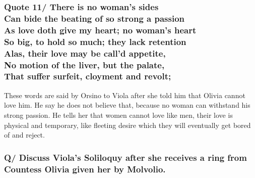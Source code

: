 \documentclass[12pt, a4paper]{article}
\begin{document}
\subsubsection*{Quote 11/
There is no woman's sides\\
Can bide the beating of so strong a passion\\
As love doth give my heart; no woman's heart\\
So big, to hold so much; they lack retention\\
Alas, their love may be call'd appetite,\\
No motion of the liver, but the palate,\\
That suffer surfeit, cloyment and revolt;
}

These words are said by Orsino to Viola after she told him that
Olivia cannot love him. He say he does not believe that, because 
no woman can withstand his strong passion. He tells her that women 
cannot love like men, their love is physical and temporary, like
fleeting desire which they will eventually get bored of and reject.

\subsubsection*{Q/ Discuss Viola's Soliloquy after she receives a ring
from Countess Olivia given her by Molvolio.}
\end{document}
